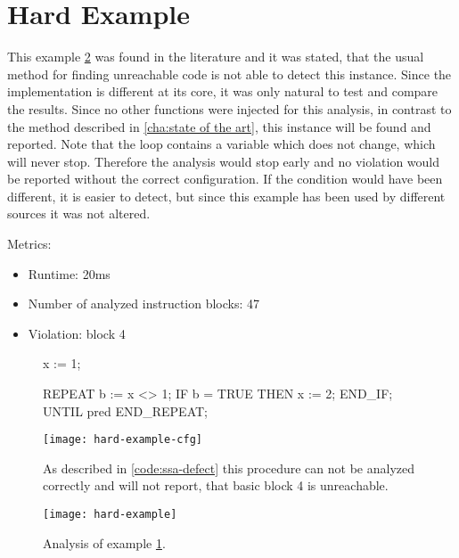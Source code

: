 \section{Hard Example}
This example \ref{code:hard example 1} was found in the literature \cite{Click_1995} and it was stated, that the usual method for finding unreachable code is not able to detect this instance. 
Since the implementation is different at its core, it was only natural to test and compare the results.
Since no other functions were injected for this analysis, in contrast to the method described in \ref{cha:state of the art}, this instance will be found and reported.
Note that the loop contains a variable which does not change, which will never stop. Therefore the analysis would stop early and no violation would be reported without the correct configuration. 
If the condition would have been different, it is easier to detect, but since this example has been used by different sources it was not altered.


Metrics:
\begin{itemize}
	\item Runtime: 20ms
	\item Number of analyzed instruction blocks: 47
	\item Violation: block 4
\end{itemize}

\begin{figure}[h!]
	\begin{GenericCode}
	x := 1;
	
	REPEAT
		b := x <> 1;
		IF b = TRUE THEN
			x := 2;
		END_IF;    
	UNTIL pred
	END_REPEAT;	\end{GenericCode}
	\centering
	\texttt{[image: hard-example-cfg]}
	\caption{As described in \ref{code:ssa-defect} this procedure can not be analyzed correctly and will not report, that basic block 4 is unreachable. }
	\label{code:hard example 1 cfg}
\end{figure}
\begin{figure}[h!]
	\centering
	\texttt{[image: hard-example]}
	\caption{Analysis of example \ref{code:hard example 1 cfg}.}
	\label{code:hard example 1}
\end{figure}


